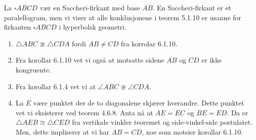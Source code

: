
\begin{oppgave}[6.1.4]
    La $\square ABCD$ vær en Saccheri-firkant med base $\overline{AB}$. 
    En Saccheri-firkant er et paralellogram, men vi viser at alle konklusjonene i teorem 5.1.10 er usanne for firkanten $\square ABCD$ i hyperbolsk geometri. 
    \begin{enumerate}
        \item $\triangle ABC \ncong \triangle CDA$ fordi $AB\neq CD$ fra korrolar 6.1.10. 
        \item Fra korollar 6.1.10 vet vi også at motsatte sidene $\overline{AB}$ og $\overline{CD}$ er ikke kongruente. 
        \item Fra korollar 6.1.4 vet vi at $\angle ABC \ncong \angle CDA$.
        \item La $E$ være punktet der de to diagonalene skjærer hverandre. 
        Dette punktet vet vi eksisterer ved teorem 4.6.8. 
        Anta nå at $AE=EC$ og $BE=ED$.
        Da er $\triangle AEB \cong \triangle CED$ fra vertikale vinkler teoremet og side-vinkel-side postulatet. 
        Men, dette impliserer at vi har $AB=CD$, noe som motsier korollar 6.1.10. 
    \end{enumerate}
\end{oppgave}


